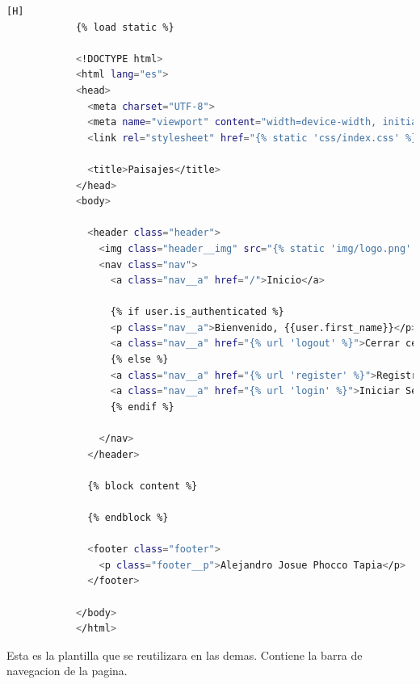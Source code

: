 \documentclass{article}
\begin{document}
    	\begin{lstlisting}[language=bash,caption={nav.html}][H]
            {% load static %}
            
            <!DOCTYPE html>
            <html lang="es">
            <head>
              <meta charset="UTF-8">
              <meta name="viewport" content="width=device-width, initial-scale=1.0">
              <link rel="stylesheet" href="{% static 'css/index.css' %}">
            
              <title>Paisajes</title>
            </head>
            <body>
              
              <header class="header">
                <img class="header__img" src="{% static 'img/logo.png' %}" alt="Icono de la pagina">
                <nav class="nav">
                  <a class="nav__a" href="/">Inicio</a>
            
                  {% if user.is_authenticated %}
                  <p class="nav__a">Bienvenido, {{user.first_name}}</p>
                  <a class="nav__a" href="{% url 'logout' %}">Cerrar cesión</a>
                  {% else %}
                  <a class="nav__a" href="{% url 'register' %}">Registrarse</a>
                  <a class="nav__a" href="{% url 'login' %}">Iniciar Sesión</a>
                  {% endif %}
            
                </nav>
              </header>
            
              {% block content %}
            
              {% endblock %}
            
              <footer class="footer">
                <p class="footer__p">Alejandro Josue Phocco Tapia</p>
              </footer>
            
            </body>
            </html>
    	\end{lstlisting}
     
            Esta es la plantilla que se reutilizara en las demas. Contiene la barra de navegacion de la pagina.
\end{document}
